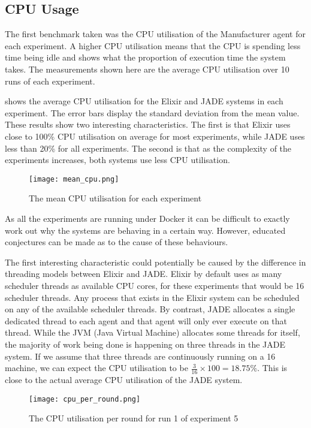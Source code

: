 \subsection{CPU Usage}

The first benchmark taken was the CPU utilisation of the Manufacturer agent for each experiment.
A higher CPU utilisation means that the CPU is spending less time being idle and shows what the proportion of execution time the system takes.
The measurements shown here are the average CPU utilisation over 10 runs of each experiment.

 shows the average CPU utilisation for the Elixir and JADE systems in each experiment.
The error bars display the standard deviation from the mean value.
These results show two interesting characteristics.
The first is that Elixir uses close to 100\% CPU utilisation on average for most experiments, while JADE uses less than 20\% for all experiments.
The second is that as the complexity of the experiments increases, both systems use less CPU utilisation.

\begin{figure}[ht]
    \centering
    \texttt{[image: mean\_cpu.png]}
    \caption{The mean CPU utilisation for each experiment}\label{fig:mean_cpu}
\end{figure}

As all the experiments are running under Docker it can be difficult to exactly work out why the systems are behaving in a certain way.
However, educated conjectures can be made as to the cause of these behaviours.

The first interesting characteristic could potentially be caused by the difference in threading models between Elixir and JADE\@.
Elixir by default uses as many scheduler threads as available CPU cores, for these experiments that would be 16 scheduler threads.
Any process that exists in the Elixir system can be scheduled on any of the available scheduler threads.
By contrast, JADE allocates a single dedicated thread to each agent and that agent will only ever execute on that thread.
While the JVM (Java Virtual Machine) allocates some threads for itself, the majority of work being done is happening on three threads in the JADE system.
If we assume that three threads are continuously running on a 16 machine, we can expect the CPU utilisation to be \(\frac{3}{16} \times 100 = 18.75\% \).
This is close to the actual average CPU utilisation of the JADE system.

\begin{figure}[ht]
    \centering
    \texttt{[image: cpu\_per\_round.png]}
    \caption{The CPU utilisation per round for run 1 of experiment 5}\label{fig:cpu_per_round}
\end{figure}

